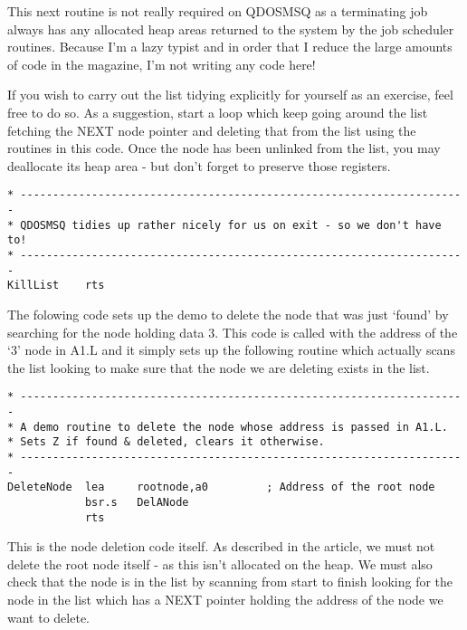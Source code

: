 This next routine is not really required on QDOSMSQ as a terminating
    job always has any allocated heap areas returned to the system by the job
    scheduler routines. Because I'm a lazy typist and in order that I reduce
    the large amounts of code in the magazine, I'm not writing any code here!

If you wish to carry out the list tidying explicitly for yourself as
    an exercise, feel free to do so. As a suggestion, start a loop which keep
    going around the list fetching the NEXT node pointer and deleting that
    from the list using the routines in this code. Once the node has been
    unlinked from the list, you may deallocate its heap area -{} but don't
    forget to preserve those registers.

\begin{lstlisting}[firstnumber=last,caption={Single Linked List - Demo Code - Kill List}]
* ---------------------------------------------------------------------
* QDOSMSQ tidies up rather nicely for us on exit - so we don't have to!
* ---------------------------------------------------------------------
KillList    rts
\end{lstlisting}

The folowing code sets up the demo to delete the node that was just
    `found' by searching for the node holding data 3. This code is called with
    the address of the `3' node in A1.L and it simply sets up the following
    routine which actually scans the list looking to make sure that the node
    we are deleting exists in the list.

\begin{lstlisting}[firstnumber=last,caption={Single Linked List - Demo Code - Delete Node}]
* ---------------------------------------------------------------------
* A demo routine to delete the node whose address is passed in A1.L. 
* Sets Z if found & deleted, clears it otherwise.
* ---------------------------------------------------------------------
DeleteNode  lea     rootnode,a0         ; Address of the root node
            bsr.s   DelANode
            rts
\end{lstlisting}

This is the node deletion code itself. As described in the article,
    we must not delete the root node itself -{} as this isn't allocated on the
    heap. We must also check that the node is in the list by scanning from
    start to finish looking for the node in the list which has a NEXT pointer
    holding the address of the node we want to delete.

